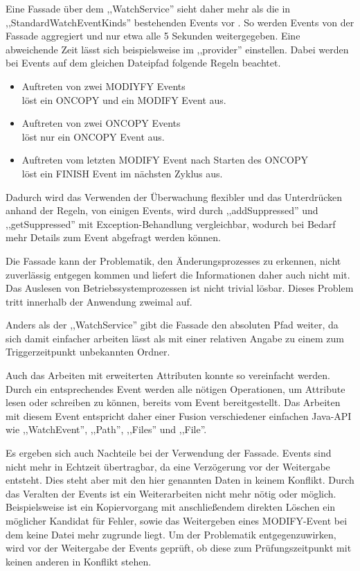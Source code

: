 \documentclass[oneside, ngerman, toc=bibliography,bibliography=totoc,listof=entryprefix, open=right,numbers=noenddot,fontsize=12pt]{scrbook}
\begin{document}
Eine Fassade  über dem ,,WatchService'' sieht daher mehr als die in  ,,StandardWatchEventKinds'' bestehenden Events vor \cite{gamma2011entwurfsmuster}. So werden Events von der Fassade aggregiert und nur etwa alle 5 Sekunden weitergegeben. Eine abweichende Zeit lässt sich beispielsweise im ,,provider'' einstellen. Dabei werden bei Events auf dem gleichen Dateipfad folgende Regeln beachtet.

\begin{itemize}
    \item Auftreten von zwei MODIYFY Events \\
    löst ein ONCOPY und ein MODIFY Event aus.
    \item Auftreten von zwei ONCOPY Events\\
    löst nur ein ONCOPY Event aus.
    \item Auftreten vom letzten MODIFY Event nach Starten des ONCOPY\\
    löst ein FINISH Event im nächsten Zyklus aus.
\end{itemize}

Dadurch wird das Verwenden der Überwachung flexibler und das Unterdrücken anhand der Regeln, von einigen Events, wird durch ,,addSuppressed'' und ,,getSuppressed'' mit Exception-Behandlung vergleichbar, wodurch bei Bedarf mehr Details zum Event abgefragt werden können.

Die Fassade kann der Problematik, den Änderungsprozesses zu erkennen, nicht zuverlässig entgegen kommen und liefert die Informationen daher auch nicht mit. Das Auslesen von Betriebssystemprozessen ist nicht trivial lösbar. Dieses Problem tritt innerhalb der Anwendung zweimal auf.

Anders als der ,,WatchService'' gibt die Fassade den absoluten Pfad weiter, da sich damit einfacher arbeiten lässt als mit einer relativen Angabe zu einem zum Triggerzeitpunkt unbekannten Ordner.

Auch das Arbeiten mit erweiterten Attributen konnte so vereinfacht werden.
Durch ein entsprechendes Event werden alle nötigen Operationen, um Attribute lesen oder schreiben zu können, bereits vom Event bereitgestellt. Das Arbeiten mit diesem Event entspricht daher einer Fusion verschiedener einfachen Java-API wie ,,WatchEvent'', ,,Path'', ,,Files'' und ,,File''.

Es ergeben sich auch Nachteile bei der Verwendung  der Fassade. Events sind nicht mehr in Echtzeit übertragbar, da eine Verzögerung vor der Weitergabe entsteht. Dies steht aber mit den hier genannten Daten in keinem Konflikt. Durch das Veralten der Events ist ein Weiterarbeiten nicht mehr nötig oder möglich. Beispielsweise ist ein Kopiervorgang mit anschließendem direkten Löschen ein möglicher Kandidat für Fehler, sowie das Weitergeben eines MODIFY-Event bei dem keine Datei mehr zugrunde liegt.
Um der Problematik entgegenzuwirken, wird vor der Weitergabe der Events geprüft, ob diese zum Prüfungszeitpunkt mit keinen anderen in Konflikt stehen.
\end{document}
